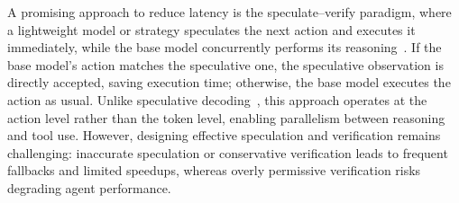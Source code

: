 
A promising approach to reduce latency is the speculate--verify paradigm, where a lightweight model or strategy speculates the next action and executes it immediately, while the base model concurrently performs its reasoning~\cite{huang2025reducing,guan2025dynamic}.
If the base model's action matches the speculative one, the speculative observation is directly accepted, saving execution time; otherwise, the base model executes the action as usual.
Unlike speculative decoding~\cite{leviathan2023fast}, this approach operates at the action level rather than the token level, enabling parallelism between reasoning and tool use.
However, designing effective speculation and verification remains challenging: inaccurate speculation or conservative verification leads to frequent fallbacks and limited speedups, whereas overly permissive verification risks degrading agent performance.




